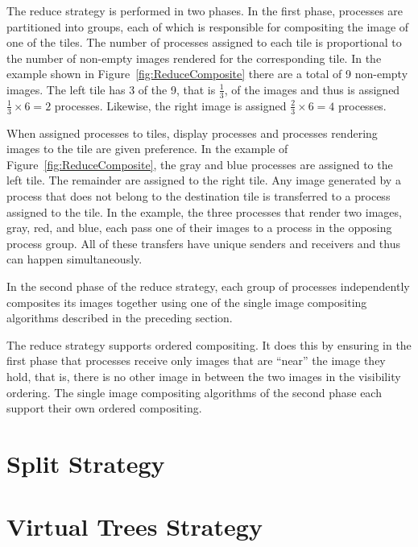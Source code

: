 The reduce strategy is performed in two phases.  In the first phase,
processes are partitioned into groups, each of which is responsible for
compositing the image of one of the tiles.  The number of processes
assigned to each tile is proportional to the number of non-empty images
rendered for the corresponding tile.  In the example shown in
Figure~\ref{fig:ReduceComposite} there are a total of 9 non-empty images.
The left tile has 3 of the 9, that is $\frac{1}{3}$, of the images and thus
is assigned $\frac{1}{3} \times 6 = 2$ processes.  Likewise, the right
image is assigned $\frac{2}{3} \times 6 = 4$ processes.

When assigned processes to tiles, display processes and processes rendering
images to the tile are given preference.  In the example of
Figure~\ref{fig:ReduceComposite}, the gray and blue processes are assigned
to the left tile.  The remainder are assigned to the right tile.  Any image
generated by a process that does not belong to the destination tile is
transferred to a process assigned to the tile.  In the example, the three
processes that render two images, gray, red, and blue, each pass one of
their images to a process in the opposing process group.  All of these
transfers have unique senders and receivers and thus can happen
simultaneously.

In the second phase of the reduce strategy, each group of processes
independently composites its images together using one of the single image
compositing algorithms described in the preceding section.

The reduce strategy supports ordered compositing.  It does this by ensuring
in the first phase that processes receive only images that are ``near'' the
image they hold, that is, there is no other image in between the two images
in the visibility ordering.  The single image compositing algorithms of the
second phase each support their own ordered compositing.


\section{Split Strategy}
\label{sec:Strategies:Split}




\section{Virtual Trees Strategy}
\label{sec:Strategies:Vertial_Trees}

